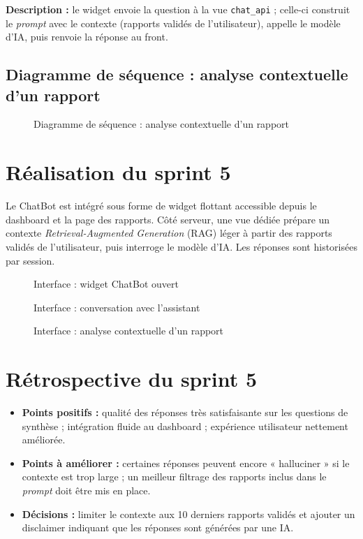 \textbf{Description :} le widget envoie la question à la vue \texttt{chat\_api} ;
celle-ci construit le \emph{prompt} avec le contexte (rapports validés de
l'utilisateur), appelle le modèle d'IA, puis renvoie la réponse au front.

\subsection{Diagramme de séquence : analyse contextuelle d'un rapport}
\begin{figure}[h!]
\centering
{}
\caption{Diagramme de séquence : analyse contextuelle d'un rapport}
\end{figure}

\section{Réalisation du sprint 5}
Le ChatBot est intégré sous forme de widget flottant accessible depuis le dashboard
et la page des rapports. Côté serveur, une vue dédiée prépare un contexte
\emph{Retrieval-Augmented Generation} (RAG) léger à partir des rapports validés de
l'utilisateur, puis interroge le modèle d'IA. Les réponses sont historisées par
session.

\begin{figure}[h!]
\centering
{}
\caption{Interface : widget ChatBot ouvert}
\end{figure}

\begin{figure}[h!]
\centering
{}
\caption{Interface : conversation avec l'assistant}
\end{figure}

\begin{figure}[h!]
\centering
{}
\caption{Interface : analyse contextuelle d'un rapport}
\end{figure}

\section{Rétrospective du sprint 5}
\begin{itemize}
\item \textbf{Points positifs :} qualité des réponses très satisfaisante sur les
questions de synthèse ; intégration fluide au dashboard ; expérience utilisateur
nettement améliorée.
\item \textbf{Points à améliorer :} certaines réponses peuvent encore « halluciner »
si le contexte est trop large ; un meilleur filtrage des rapports inclus dans le
\emph{prompt} doit être mis en place.
\item \textbf{Décisions :} limiter le contexte aux 10 derniers rapports validés et
ajouter un disclaimer indiquant que les réponses sont générées par une IA.
\end{itemize}

